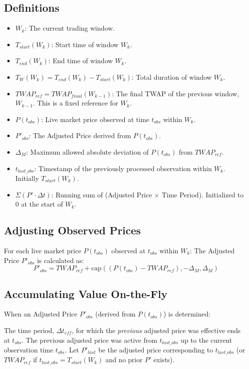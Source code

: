 \documentclass{article}
\begin{document}
\subsection*{Definitions}
\begin{itemize}
    \item $W_k$: The current trading window.
    \item $T_{start}(W_k)$: Start time of window $W_k$.
    \item $T_{end}(W_k)$: End time of window $W_k$.
    \item $T_W(W_k) = T_{end}(W_k) - T_{start}(W_k)$: Total duration of window $W_k$.
    \item $TWAP_{ref} = TWAP_{final}(W_{k-1})$: The final TWAP of the previous window, $W_{k-1}$. This is a fixed reference for $W_k$.
    \item $P(t_{obs})$: Live market price observed at time $t_{obs}$ within $W_k$.
    \item $P'_{obs}$: The Adjusted Price derived from $P(t_{obs})$.
    \item $\Delta_M$: Maximum allowed absolute deviation of $P(t_{obs})$ from $TWAP_{ref}$.
    \item $t_{last\_obs}$: Timestamp of the previously processed observation within $W_k$. Initially $T_{start}(W_k)$.
    \item $\Sigma (P' \cdot \Delta t)$: Running sum of (Adjusted Price $\times$ Time Period). Initialized to 0 at the start of $W_k$.
\end{itemize}

\subsection*{Adjusting Observed Prices}
For each live market price $P(t_{obs})$ observed at $t_{obs}$ within $W_k$:
The Adjusted Price $P'_{obs}$ is calculated as:
\[ P'_{obs} = TWAP_{ref} + \text{cap} \left( (P(t_{obs}) - TWAP_{ref}), -\Delta_M, \Delta_M \right) \]

\subsection*{Accumulating Value On-the-Fly}
When an Adjusted Price $P'_{obs}$ (derived from $P(t_{obs})$) is determined:

The time period, $\Delta t_{eff}$, for which the \textit{previous} adjusted price was effective ends at $t_{obs}$.
The previous adjusted price was active from $t_{last\_obs}$ up to the current observation time $t_{obs}$.
Let $P'_{last}$ be the adjusted price corresponding to $t_{last\_obs}$ (or $TWAP_{ref}$ if $t_{last\_obs} = T_{start}(W_k)$ and no prior $P'$ exists).
\end{document}
